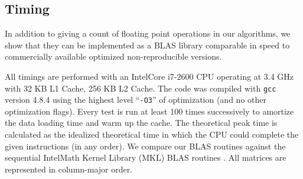 \subsection{Timing}
  In addition to giving a count of floating point operations in our algorithms, we show that they can be implemented as a BLAS library comparable in speed to commercially available optimized non-reproducible versions.

  All timings are performed with an Intel\textregistered Core i7-2600 CPU operating at 3.4 GHz with 32 KB L1 Cache, 256 KB L2 Cache. The code was compiled with \texttt{gcc} version 4.8.4 using the highest level ``\texttt{-O3}'' of optimization (and no other optimization flags). Every test is run at least 100 times successively to amortize the data loading time and warm up the cache. The theoretical peak time is calculated as the idealized theoretical time in which the CPU could complete the given instructions (in any order). We compare our BLAS routines against the sequential Intel\textregistered Math Kernel Library (MKL) BLAS routines \cite{MKL}. All matrices are represented in column-major order.

